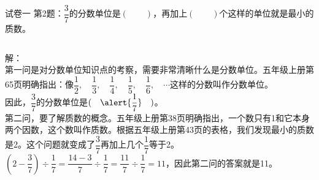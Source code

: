 \documentclass[aspectratio=169]{ctexbeamer} %
\date{\today}
\begin{document}
\begin{frame}[t]{试卷一}
第2题：$\dfrac{3}{7}$的分数单位是$(\qquad)$，再加上$(\qquad)$个这样的单位就是最小的质数。
\pause
\begin{columns}
解：\\
第一问是对分数单位知识点的考察，需要非常清晰什么是分数单位。\alert{五年级上册第65页}明确指出：像$\dfrac{1}{2}, \quad \dfrac{1}{3}, \quad \dfrac{1}{4}, \quad \dfrac{1}{5}, \quad \dfrac{1}{6}, \quad \cdots$这样的分数叫作\alert{分数单位}。\\
因此，$\dfrac{3}{7}$的分数单位是$(\quad \alert{\dfrac{1}{7}} \quad )$。\\
\pause
第二问，要了解质数的概念。\alert{五年级上册第38页}明确指出，一个数只有1和它本身两个因数，这个数叫作\alert{质数}。根据\alert{五年级上册第43页}的表格，我们发现最小的质数是\alert{2}。这个问题就变成了$\dfrac{3}{7}$再加上几个$\dfrac{1}{7}$等于2。\\
$\left(2 - \dfrac{3}{7}\right) \div \dfrac{1}{7} = \dfrac{14 -3}{7} \div \dfrac{1}{7} = \dfrac{11}{7} \div \dfrac{1}{7}= 11$，因此第二问的答案就是\alert{11}。
\end{columns}
\end{frame}
\end{document}
